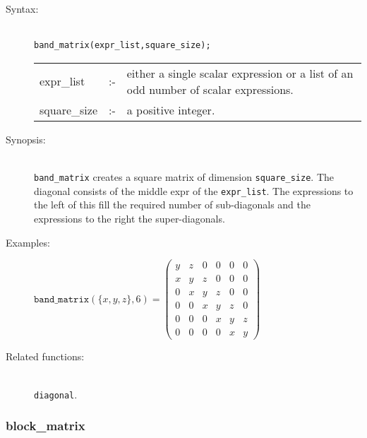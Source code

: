 \begin{description}
\item[Syntax:]\mbox{}\\
\texttt{band\_matrix(expr\_list,square\_size);}\\[2mm]
\begin{tabular}{l l p{.72\linewidth}}
expr\_list  &:-&
either a single scalar expression or a list of an odd number of scalar
expressions. \\
square\_size &:-& a positive integer.
\end{tabular}


\item[Synopsis:]\mbox{}\\
                \texttt{band\_matrix} creates a square matrix of
                dimension \texttt{square\_size}. The diagonal consists of the
                middle expr of the \texttt{expr\_list}. The expressions to the
                left of this fill the required number of sub-diagonals and the
                expressions to the right the super-diagonals.

\item[Examples:]
\begin{flushleft}
\(
\texttt{band\_matrix}(\{x,y,z\},6) =
 \begin{pmatrix} y & z & 0 & 0 & 0 & 0 \\
                 x & y & z & 0 & 0 & 0 \\
                 0 & x & y & z & 0 & 0 \\
                 0 & 0 & x & y & z & 0 \\
                 0 & 0 & 0 & x & y & z \\
                 0 & 0 & 0 & 0 & x & y
 \end{pmatrix}
\)
\end{flushleft}

\item[Related functions:]\mbox{}\\
 \texttt{diagonal}.
\end{description}


\subsubsection{block\_matrix}
\label{linalg:block_matrix}

